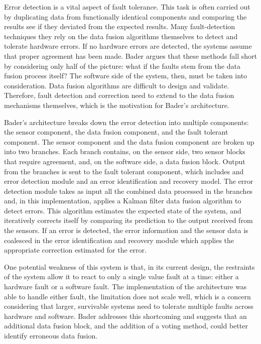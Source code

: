\documentclass[twoside, conference]{IEEEtran}
\begin{document}
Error detection is a vital aspect of fault tolerance. This task is often carried out by duplicating data from functionally identical components and comparing the results see if they deviated from the expected results. Many fault-detection techniques they rely on the data fusion algorithms themselves to detect and tolerate hardware errors. If no hardware errors are detected, the systems assume that proper agreement has been made. Bader argues that these methods fall short by considering only half of the picture: what if the faults stem from the data fusion process itself? The software side of the system, then, must be taken into consideration. Data fusion algorithms are difficult to design and validate. Therefore, fault detection and correction need to extend to the data fusion mechanisms themselves, which is the motivation for Bader's architecture. \cite{Bader2014}

Bader's architecture breaks down the error detection into multiple components: the sensor component, the data fusion component, and the fault tolerant component. The sensor component and the data fusion component are broken up into two branches. Each branch contains, on the sensor side, two sensor blocks that require agreement, and, on the software side, a data fusion block. Output from the branches is sent to the fault tolerant component, which includes and error detection module and an error identification and recovery model. The error detection module takes as input all the combined data processed in the branches and, in this implementation, applies a Kalman filter data fusion algorithm to detect errors. This algorithm estimates the expected state of the system, and iteratively corrects itself by comparing its prediction to the output received from the sensors. If an error is detected, the error information and the sensor data is coalesced in the error identification and recovery module which applies the appropriate correction estimated for the error. \cite{Bader2014}

One potential weakness of this system is that, in its current design, the restraints of the system allow it to react to only a single value fault at a time: either a hardware fault or a software fault. The implementation of the architecture was able to handle either fault, the limitation does not scale well, which is a concern considering that larger, survivable systems need to tolerate multiple faults across hardware and software. Bader addresses this shortcoming and suggests that an additional data fusion block, and the addition of a voting method, could better identify erroneous data fusion. \cite{Bader2014}
\end{document}
